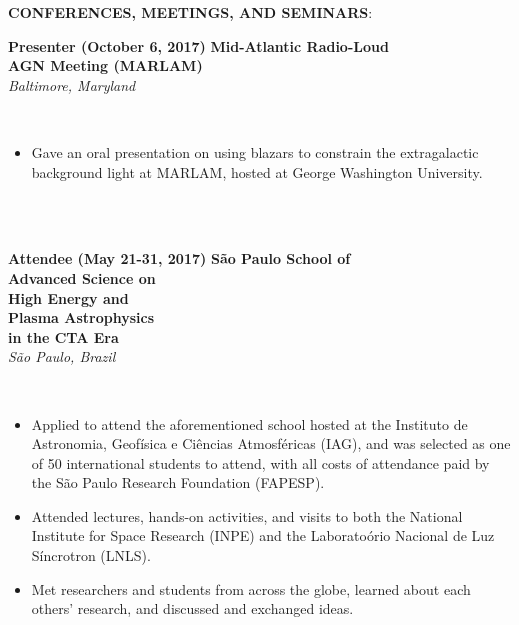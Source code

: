 \documentclass{article}
\begin{document}
\noindent \textbf{CONFERENCES, MEETINGS, AND SEMINARS}:\\
\begin{vwcol}[widths={0.8,0.2}, sep=.8cm, justify=flush, rule=0pt, indent=0em]
\noindent \textbf{Presenter (October 6, 2017)}
\newpage
\noindent \textbf{Mid-Atlantic Radio-Loud}\\
\noindent \textbf{AGN Meeting (MARLAM)}\\
\noindent \emph{Baltimore, Maryland}
\end{vwcol}
\phantom \\
\begin{itemize}
\item Gave an oral presentation on using blazars to constrain the extragalactic background light at MARLAM, hosted at George Washington University.
\end{itemize}
\phantom \\
\phantom \\
%
%
%
%
\begin{vwcol}[widths={0.8,0.2}, sep=.8cm, justify=flush, rule=0pt, indent=0em]
\noindent \textbf{Attendee (May 21-31, 2017)}
\newpage
\noindent \textbf{S\~{a}o Paulo School of}\\
\noindent \textbf{Advanced Science on}\\
\noindent \textbf{High Energy and}\\
\noindent \textbf{Plasma Astrophysics}\\
\noindent \textbf{in the CTA Era}\\
\noindent \emph{S\~{a}o Paulo, Brazil}
\end{vwcol}
\phantom \\
\begin{itemize}
\item Applied to attend the aforementioned school hosted at the Instituto de Astronomia, Geof\'{i}sica e Ci\^{e}ncias Atmosf\'{e}ricas (IAG), and was selected as one of 50 international students to attend, with all costs of attendance paid by the S\~{a}o Paulo Research Foundation (FAPESP).
\item Attended lectures, hands-on activities, and visits to both the National Institute for Space Research (INPE) and the Laborato\'{o}rio Nacional de Luz S\'{i}ncrotron (LNLS).
\item Met researchers and students from across the globe, learned about each others' research, and discussed and exchanged ideas.
\end{itemize}
\end{document}
